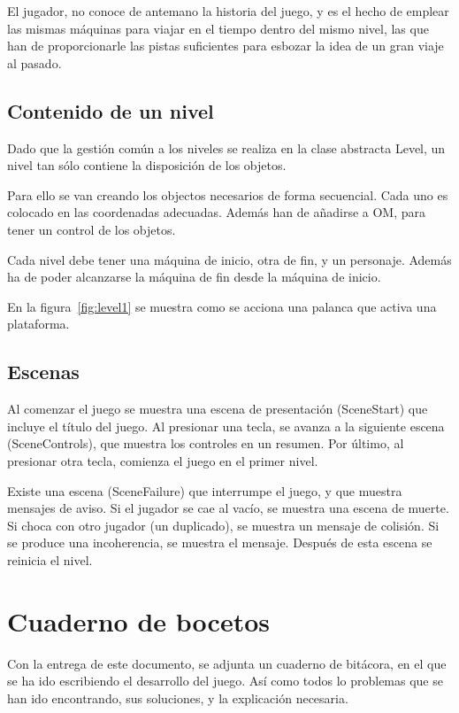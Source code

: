 \documentclass[11pt,a4paper]{article}
\begin{document}
El jugador, no conoce de antemano la historia del juego, y es el hecho de 
emplear las mismas máquinas para viajar en el tiempo dentro del mismo nivel, las 
que han de proporcionarle las pistas suficientes para esbozar la idea de un gran 
viaje al pasado.

\subsection{Contenido de un nivel}
Dado que la gestión común a los niveles se realiza en la clase abstracta Level, 
un nivel tan sólo contiene la disposición de los objetos.

Para ello se van creando los objectos necesarios de forma secuencial. Cada uno 
es colocado en las coordenadas adecuadas. Además han de añadirse a OM, para 
tener un control de los objetos.

Cada nivel debe tener una máquina de inicio, otra de fin, y un personaje.  
Además ha de poder alcanzarse la máquina de fin desde la máquina de inicio.

En la figura~\ref{fig:level1} se muestra como se acciona una palanca que activa 
una plataforma.

\subsection{Escenas}

Al comenzar el juego se muestra una escena de presentación (SceneStart) que 
incluye el título del juego. Al presionar una tecla, se avanza a la siguiente 
escena (SceneControls), que muestra los controles en un resumen. Por último, al 
presionar otra tecla, comienza el juego en el primer nivel.

Existe una escena (SceneFailure) que interrumpe el juego, y que muestra mensajes 
de aviso.  Si el jugador se cae al vacío, se muestra una escena de muerte. Si 
choca con otro jugador (un duplicado), se muestra un mensaje de colisión. Si se 
produce una incoherencia, se muestra el mensaje. Después de esta escena se 
reinicia el nivel.

\section{Cuaderno de bocetos}
Con la entrega de este documento, se adjunta un cuaderno de bitácora, en el que 
se ha ido escribiendo el desarrollo del juego. Así como todos lo problemas que 
se han ido encontrando, sus soluciones, y la explicación necesaria.
\end{document}
